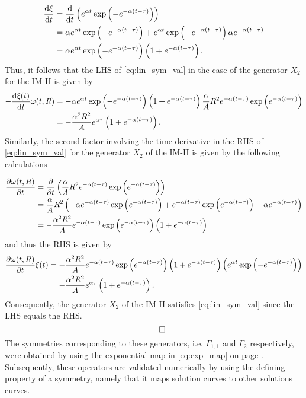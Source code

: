 \begin{align*}
  \dv{\xi}{t}&=\dv{}{t}\left(e^{\alpha t}\exp\left(-e^{-\alpha (t-\tau)}\right)\right)\\
             &=\alpha e^{\alpha t}\exp\left(-e^{-\alpha (t-\tau)}\right)+e^{\alpha t}\exp\left(-e^{-\alpha (t-\tau)}\right)\alpha e^{-\alpha (t-\tau)}\\
  &=\alpha e^{\alpha t}\exp\left(-e^{-\alpha (t-\tau)}\right)\left(1+e^{-\alpha (t-\tau)}\right).\\
\end{align*}
Thus, it follows that the LHS of \eqref{eq:lin_sym_val} in the case of the generator $X_{2}$ for the IM-II is given by
\begin{align*}
  -\dv{\xi(t)}{t}\omega(t,R)&=-\alpha e^{\alpha t}\exp\left(-e^{-\alpha (t-\tau)}\right)\left(1+e^{-\alpha (t-\tau)}\right)\frac{\alpha}{A}R^2e^{-\alpha(t-\tau)}\exp\left(e^{-\alpha(t-\tau)}\right)\\
  &=-\dfrac{\alpha^2R^2}{A}e^{\alpha\tau}\left(1+e^{-\alpha (t-\tau)}\right).
\end{align*}
Similarly, the second factor involving the time derivative in the RHS of \eqref{eq:lin_sym_val} for the generator $X_{2}$ of the IM-II is given by the following calculations

\begin{align*}
  \pdv{\omega(t,R)}{t}&=\pdv{}{t}\left(\frac{\alpha}{A}R^2e^{-\alpha(t-\tau)}\exp\left(e^{-\alpha(t-\tau)}\right)\right)\\
                      &=\dfrac{\alpha}{A}R^2\left(-\alpha e^{-\alpha(t-\tau)}\exp\left(e^{-\alpha(t-\tau)}\right)+e^{-\alpha(t-\tau)}\exp\left(e^{-\alpha(t-\tau)}\right)-\alpha e^{-\alpha(t-\tau)}\right)\\
  &=-\dfrac{\alpha^2R^2}{A} e^{-\alpha(t-\tau)}\exp\left(e^{-\alpha(t-\tau)}\right)\left(1+e^{-\alpha (t-\tau)}\right)
\end{align*}
and thus the RHS is given by
\begin{align*}
  \pdv{\omega(t,R)}{t}\xi(t)&=-\dfrac{\alpha^2R^2}{A} e^{-\alpha(t-\tau)}\exp\left(e^{-\alpha(t-\tau)}\right)\left(1+e^{-\alpha (t-\tau)}\right)\left(e^{\alpha t}\exp\left(-e^{-\alpha(t-\tau)}\right)\right)\\
  &=-\dfrac{\alpha^2R^2}{A}e^{\alpha\tau}\left(1+e^{-\alpha (t-\tau)}\right).
\end{align*}
Consequently, the generator $X_{2}$ of the IM-II satisfies \eqref{eq:lin_sym_val} since the LHS equals the RHS.
$$\qed$$
The symmetries corresponding to these generators, i.e. $\Gamma_{1,1}$ and $\Gamma_{2}$ respectively, were obtained by using the exponential map in \eqref{eq:exp_map} on page \pageref{eq:exp_map}. Subsequently, these operators are validated numerically by using the defining property of a symmetry, namely that it maps solution curves to other solutions curves. 
